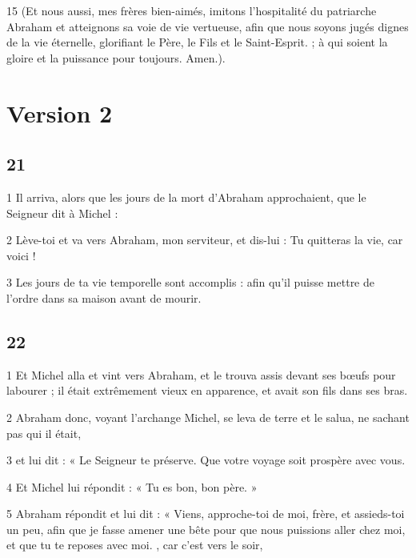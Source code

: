 \par 15 (Et nous aussi, mes frères bien-aimés, imitons l'hospitalité du patriarche Abraham et atteignons sa voie de vie vertueuse, afin que nous soyons jugés dignes de la vie éternelle, glorifiant le Père, le Fils et le Saint-Esprit. ; à qui soient la gloire et la puissance pour toujours. Amen.).

\part{Version 2}

\chapter{21}

\par 1 Il arriva, alors que les jours de la mort d'Abraham approchaient, que le Seigneur dit à Michel :

\par 2 Lève-toi et va vers Abraham, mon serviteur, et dis-lui : Tu quitteras la vie, car voici !

\par 3 Les jours de ta vie temporelle sont accomplis : afin qu'il puisse mettre de l'ordre dans sa maison avant de mourir.

\chapter{22}

\par 1 Et Michel alla et vint vers Abraham, et le trouva assis devant ses bœufs pour labourer ; il était extrêmement vieux en apparence, et avait son fils dans ses bras.

\par 2 Abraham donc, voyant l'archange Michel, se leva de terre et le salua, ne sachant pas qui il était,

\par 3 et lui dit : « Le Seigneur te préserve. Que votre voyage soit prospère avec vous.

\par 4 Et Michel lui répondit : « Tu es bon, bon père. »

\par 5 Abraham répondit et lui dit : « Viens, approche-toi de moi, frère, et assieds-toi un peu, afin que je fasse amener une bête pour que nous puissions aller chez moi, et que tu te reposes avec moi. , car c'est vers le soir,

